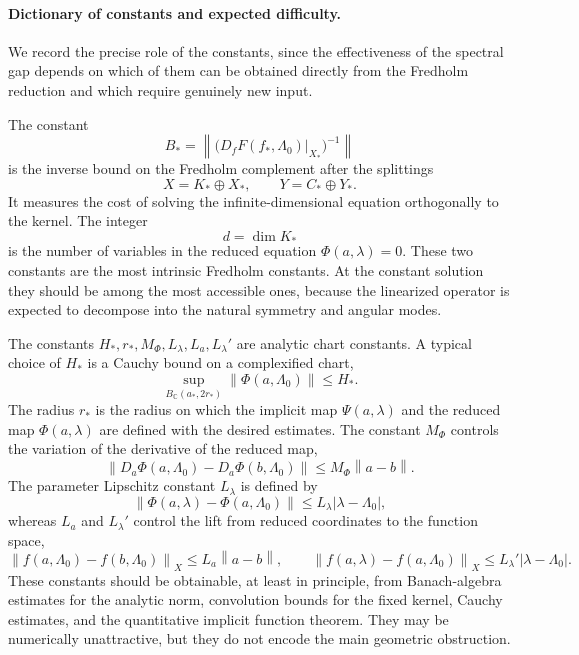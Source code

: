 \documentclass[12pt]{article}
\theoremstyle{definition}
\theoremstyle{remark}
\newcommand{\C}{\mathbb{C}}
\newcommand{\norm}[1]{\left\|#1\right\|}
\begin{document}
\paragraph{Dictionary of constants and expected difficulty.}
We record the precise role of the constants, since the effectiveness of
the spectral gap depends on which of them can be obtained directly from
the Fredholm reduction and which require genuinely new input.

The constant
\[
  B_*=
  \norm{\bigl(D_fF(f_*,\Lambda_0)|_{X_*}\bigr)^{-1}}
\]
is the inverse bound on the Fredholm complement after the splittings
\[
  X=K_*\oplus X_*,
  \qquad
  Y=C_*\oplus Y_*.
\]
It measures the cost of solving the infinite-dimensional equation
orthogonally to the kernel.  The integer
\[
  d=\dim K_*
\]
is the number of variables in the reduced equation
\(\Phi(a,\lambda)=0\).  These two constants are the most intrinsic
Fredholm constants.  At the constant solution they should be among the
most accessible ones, because the linearized operator is expected to
decompose into the natural symmetry and angular modes.

The constants \(H_*,r_*,M_\Phi,L_\lambda,L_a,L_\lambda'\) are analytic
chart constants.  A typical choice of \(H_*\) is a Cauchy bound on a
complexified chart,
\[
  \sup_{B_\C(a_*,2r_*)}\norm{\Phi(a,\Lambda_0)}\leq H_*.
\]
The radius \(r_*\) is the radius on which the implicit map
\(\Psi(a,\lambda)\) and the reduced map \(\Phi(a,\lambda)\) are defined
with the desired estimates.  The constant \(M_\Phi\) controls the
variation of the derivative of the reduced map,
\[
  \norm{D_a\Phi(a,\Lambda_0)-D_a\Phi(b,\Lambda_0)}
  \leq M_\Phi\norm{a-b}.
\]
The parameter Lipschitz constant \(L_\lambda\) is defined by
\[
  \norm{\Phi(a,\lambda)-\Phi(a,\Lambda_0)}
  \leq L_\lambda|\lambda-\Lambda_0|,
\]
whereas \(L_a\) and \(L_\lambda'\) control the lift from reduced
coordinates to the function space,
\[
  \norm{f(a,\Lambda_0)-f(b,\Lambda_0)}_X
  \leq L_a\norm{a-b},
  \qquad
  \norm{f(a,\lambda)-f(a,\Lambda_0)}_X
  \leq L_\lambda'|\lambda-\Lambda_0|.
\]
These constants should be obtainable, at least in principle, from
Banach-algebra estimates for the analytic norm, convolution bounds for
the fixed kernel, Cauchy estimates, and the quantitative implicit
function theorem.  They may be numerically unattractive, but they do not
encode the main geometric obstruction.
\end{document}
